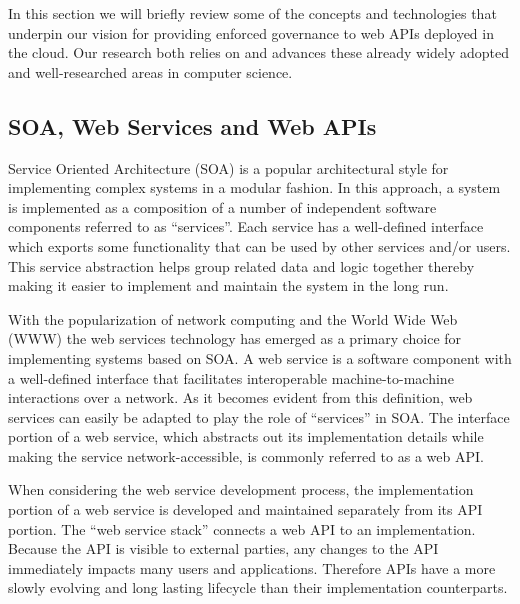 In this section we will briefly review some of the concepts and technologies that underpin our vision for providing enforced governance to
web APIs deployed in the cloud. Our research both relies on and advances these already widely adopted and well-researched areas in
computer science.

\subsection{SOA, Web Services and Web APIs}
Service Oriented Architecture (SOA) is a popular architectural style for implementing complex systems in a modular fashion. In this approach, 
a system 
is implemented as a composition of a number of independent software components referred to as ``services''. Each service has a well-defined
interface which exports some functionality that can be used by other services and/or users. This service abstraction helps group related data
and logic together thereby making it easier to implement and maintain the system in the long run. %

With the popularization of network computing and the World Wide Web (WWW) the web services technology has emerged as a primary choice 
for implementing systems based on SOA. A web service is a
software component with a well-defined interface that facilitates interoperable machine-to-machine interactions over a network. As it becomes 
evident from
this definition, web services can easily be adapted to play the role of  ``services'' in SOA. The interface portion of a web service, which
abstracts out its implementation details while making the service network-accessible, is commonly referred to as 
a web API. %

When considering the web service development process, the implementation portion of a web service is developed and maintained separately from
its API portion. The ``web service stack'' connects a web API to an implementation. Because the API is visible to external parties, any 
changes to the API immediately impacts many users and applications. Therefore APIs have a more slowly evolving and long lasting lifecycle than 
their implementation counterparts. 

